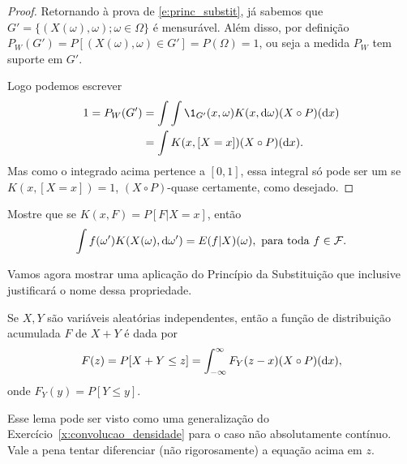 \begin{proof}
  Retornando à prova de \eqref{e:princ_substit}, já sabemos que $G' = \{(X(\omega), \omega); \omega \in \Omega\}$ é mensurável.
  Além disso, por definição $P_W(G') = P[(X(\omega), \omega) \in G'] = P(\Omega) = 1$, ou seja a medida $P_W$ tem suporte em $G'$.

  Logo podemos escrever
  \begin{equation}
    \begin{split}
      1 = P_W(G') & = \int \int \1_{G'} (x, \omega) K(x, \d \omega) (X \circ P) (\d x)\\
      & = \int K(x, [X = x]) (X \circ P) (\d x).
    \end{split}
  \end{equation}
  Mas como o integrado acima pertence a $[0,1]$, essa integral só pode ser um se $K(x, [X = x]) = 1$, $(X \circ P)$-quase certamente, como desejado.
\end{proof}

\begin{exercise}
  Mostre que se $K(x, F) = P[F| X = x]$, então
  \begin{equation}
    \label{e:reg_cond_exp_givenX}
    \int f(\omega') K(X(\omega), \mathop{}\!\mathrm{d} \omega') = E(f | X)(\omega), \text{ para toda $f \in \mathcal{F}$}.
  \end{equation}
\end{exercise}

Vamos agora mostrar uma aplicação do Princípio da Substituição que inclusive justificará o nome dessa propriedade.

\begin{lemma}
  Se $X, Y$ são variáveis aleatórias independentes, então a função de distribuição acumulada $F$ de $X + Y$ é dada por
  \begin{equation}
    F(z) = P[X + Y \leq z] = \int_{-\infty}^\infty F_Y(z - x) (X \circ P) (\mathop{}\!\mathrm{d} x),
  \end{equation}
  onde $F_Y(y) = P[Y \leq y]$.
\end{lemma}

Esse lema pode ser visto como uma generalização do Exercício~\ref{x:convolucao_densidade} para o caso não absolutamente contínuo.
Vale a pena tentar diferenciar (não rigorosamente) a equação acima em $z$.

